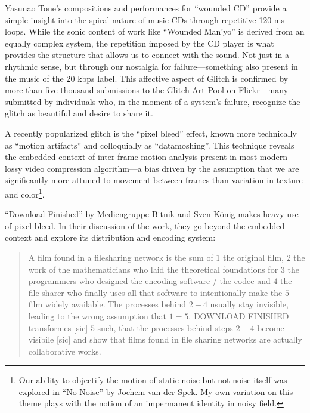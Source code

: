 \documentclass{thesis}
\begin{document}
Yasunao Tone's compositions and performances for ``wounded CD''\cite{media_art_net_media_2010} provide a simple insight into the spiral nature of music CDs through repetitive 120 ms loops. While the sonic content of work like ``Wounded Man'yo'' is derived from an equally complex system, the repetition imposed by the CD player is what provides the structure that allows us to connect with the sound. Not just in a rhythmic sense, but through our nostalgia for failure---something also present in the music of the 20 kbps label\cite{_20kbps_2010}. This affective aspect of Glitch is confirmed by more than five thousand submissions to the Glitch Art Pool on Flickr\cite{liminalmike_flickr:glitch_????}---many submitted by individuals who, in the moment of a system's failure, recognize the glitch as beautiful and desire to share it.
	
A recently popularized glitch is the ``pixel bleed''\cite{john_michael_boling_rhizome_????} effect, known more technically as ``motion artifacts'' and colloquially as ``datamoshing''. This technique reveals the embedded context of inter-frame motion analysis present in most modern lossy video compression algorithm---a bias driven by the assumption that we are significantly more attuned to movement between frames than variation in texture and color\footnote{Our ability to objectify the motion of static noise but not noise itself was explored in ``No Noise''\cite{jochem_van_der_spek_no_2001} by Jochem van der Spek. My own variation on this theme \cite{kyle_mcdonald_no_2010} plays with the notion of an impermanent identity in noisy field.}.

``Download Finished'' by Mediengruppe Bitnik and Sven K\"onig\cite{!mediengruppe_bitnik_and_sven_knig_download_????}  makes heavy use of pixel bleed. In their discussion of the work, they go beyond the embedded context and explore its distribution and encoding system:

	\begin{quote}
	A film found in a filesharing network is the sum of $1$ the original film, $2$ the work of the mathematicians who laid the theoretical foundations for $3$ the programmers who designed the encoding software / the codec and $4$ the file sharer who finally uses all that software to intentionally make the $5$ film widely available. The processes behind $2-4$ usually stay invisible, leading to the wrong assumption that $1=5$. DOWNLOAD FINISHED transformes [sic] $5$ such, that the processes behind steps $2-4$ become visibile [sic] and show that films found in file sharing networks are actually collaborative works.
	\end{quote}
	
\end{document}
